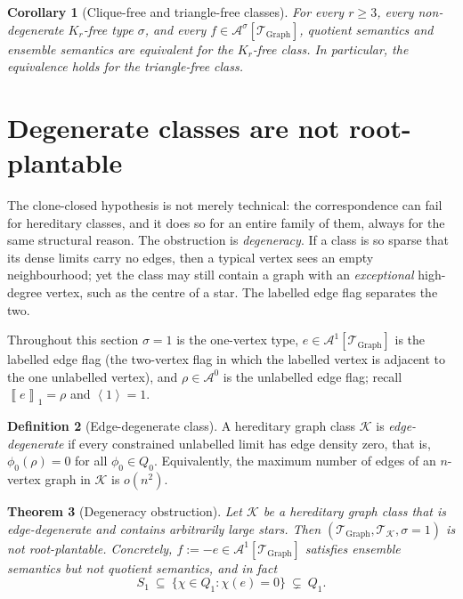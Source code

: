 \documentclass[11pt]{article}
\newtheorem{theorem}{Theorem}
\newtheorem{corollary}[theorem]{Corollary}
\theoremstyle{definition}
\newtheorem{definition}[theorem]{Definition}
\newcommand{\A}{\mathcal{A}}
\newcommand{\K}{\mathcal{K}}
\newcommand{\T}{\mathcal{T}}
\newcommand{\brak}[1]{\left\langle #1\right\rangle}
\newcommand{\avg}[2]{\left\llbracket #1 \right\rrbracket_{#2}}
\begin{document}
\begin{corollary}[Clique-free and triangle-free classes]\label{cor:clique-free}
For every $r\ge3$, every non-degenerate $K_r$-free type $\sigma$, and every
$f\in\A^\sigma[\T_{\mathrm{Graph}}]$, quotient semantics and ensemble semantics
are equivalent for the $K_r$-free class.  In particular, the equivalence holds
for the triangle-free class.
\end{corollary}

\section{Degenerate classes are not root-plantable}

The clone-closed hypothesis is not merely technical: the correspondence can fail for
hereditary classes, and it does so for an entire family of them, always for the same
structural reason.  The obstruction is \emph{degeneracy}.  If a class is so sparse
that its dense limits carry no edges, then a typical vertex sees an empty
neighbourhood; yet the class may still contain a graph with an \emph{exceptional}
high-degree vertex, such as the centre of a star.  The labelled edge flag separates the
two.

Throughout this section $\sigma=1$ is the one-vertex type,
$e\in\A^1[\T_{\mathrm{Graph}}]$ is the labelled edge flag (the two-vertex flag in which
the labelled vertex is adjacent to the one unlabelled vertex), and $\rho\in\A^0$ is
the unlabelled edge flag; recall $\avg{e}{1}=\rho$ and $\brak1=1$.

\begin{definition}[Edge-degenerate class]\label{def:edge-degenerate}
A hereditary graph class $\K$ is \emph{edge-degenerate} if every constrained
unlabelled limit has edge density zero, that is, $\phi_0(\rho)=0$ for all
$\phi_0\in Q_0$.  Equivalently, the maximum number of edges of an $n$-vertex graph
in $\K$ is $o(n^2)$.
\end{definition}

\begin{theorem}[Degeneracy obstruction]\label{thm:degenerate-obstruction}
Let $\K$ be a hereditary graph class that is edge-degenerate and contains
arbitrarily large stars.  Then $(\T_{\mathrm{Graph}},\T_\K,\sigma{=}1)$ is not
root-plantable.  Concretely, $f:=-e\in\A^1[\T_{\mathrm{Graph}}]$ satisfies ensemble
semantics but not quotient semantics, and in fact
\[
  S_1\ \subseteq\ \{\chi\in Q_1:\chi(e)=0\}\ \subsetneq\ Q_1 .
\]
\end{theorem}
\end{document}
